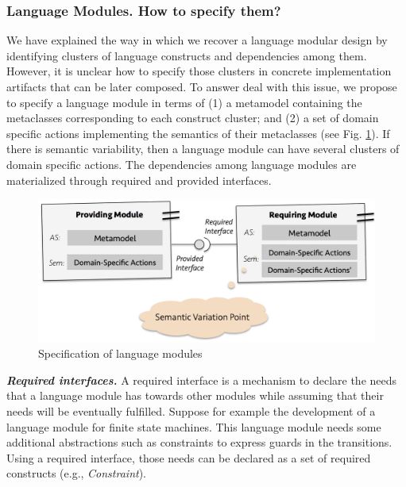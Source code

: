 \subsubsection{Language Modules. \textbf{How to specify them?}}

We have explained the way in which we recover a language modular design by identifying clusters of language constructs and dependencies among them. However, it is unclear how to specify those clusters in concrete implementation artifacts that can be later composed. To answer deal with this issue, we propose to specify a language module in terms of (1) a metamodel containing the metaclasses corresponding to each construct cluster; and (2) a set of domain specific actions implementing the semantics of their metaclasses (see Fig. \ref{fig:modulespec}). If there is semantic variability, then a language module can have several clusters of domain specific actions. The dependencies among language modules are materialized through required and provided interfaces. 

\begin{figure}[h!]
\centering
\includegraphics[width=1\linewidth]{images/language-modules-specification.png}
\caption{Specification of language modules}
\label{fig:modulespec}
\end{figure}



\vspace{2mm}
\textit{\textbf{Required interfaces.}} A required interface is a mechanism to declare the needs that a language module has towards other modules while assuming that their needs will be eventually fulfilled. Suppose for example the development of a language module for finite state machines. This language module needs some additional abstractions such as constraints to express guards in the transitions. Using a required interface, those needs can be declared as a set of required constructs (e.g., \textsl{Constraint}). 

